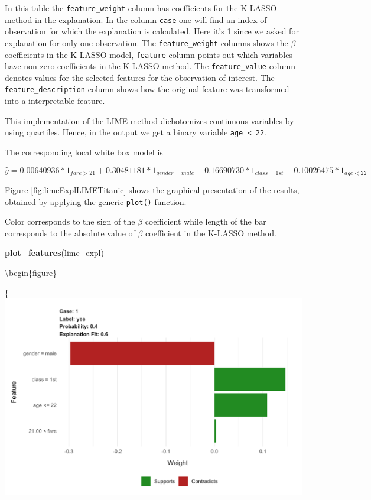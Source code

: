 \documentclass[12pt,]{krantz}
\newenvironment{Shaded}{\begin{snugshade}}{\end{snugshade}}
\newcommand{\KeywordTok}[1]{\textcolor[rgb]{0.13,0.29,0.53}{\textbf{#1}}}
\newcommand{\NormalTok}[1]{#1}
\begin{document}
In this table the \texttt{feature\_weight} column has coefficients for the K-LASSO method in the explanation. In the column \texttt{case} one will find an index of observation for which the explanation is calculated. Here it's 1 since we asked for explanation for only one observation.
The \texttt{feature\_weight} columns shows the \(\beta\) coefficients in the K-LASSO model, \texttt{feature} column points out which variables have non zero coefficients in the K-LASSO method. The \texttt{feature\_value} column denotes values for the selected features for the observation of interest. The \texttt{feature\_description} column shows how the original feature was transformed into a interpretable feature.

This implementation of the LIME method dichotomizes continuous variables by using quartiles. Hence, in the output we get a binary variable \texttt{age\ \textless{}\ 22}.

The corresponding local white box model is

\[
\hat y = 0.00640936 * 1_{fare > 21} + 0.30481181 * 1_{gender = male} - 
0.16690730 * 1_{class = 1st} -0.10026475 * 1_{age < 22}
\]

Figure \ref{fig:limeExplLIMETitanic} shows the graphical presentation of the results, obtained by applying the generic \texttt{plot()} function.

Color corresponds to the sign of the \(\beta\) coefficient while length of the bar corresponds to the absolute value of \(\beta\) coefficient in the K-LASSO method.

\begin{Shaded}
\begin{Highlighting}[]
\KeywordTok{plot_features}\NormalTok{(lime_expl)}
\end{Highlighting}
\end{Shaded}

\textbackslash{}begin\{figure\}

\{\centering \includegraphics[width=0.6\linewidth]{figure/lime_expl_lime_titanic}
\end{document}
